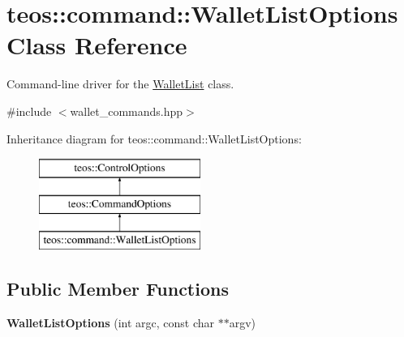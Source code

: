 \hypertarget{classteos_1_1command_1_1_wallet_list_options}{}\section{teos\+:\+:command\+:\+:Wallet\+List\+Options Class Reference}
\label{classteos_1_1command_1_1_wallet_list_options}


Command-\/line driver for the \mbox{\hyperlink{classteos_1_1command_1_1_wallet_list}{Wallet\+List}} class.  




{\ttfamily \#include $<$wallet\+\_\+commands.\+hpp$>$}

Inheritance diagram for teos\+:\+:command\+:\+:Wallet\+List\+Options\+:\begin{figure}[H]
\begin{center}
\leavevmode
\includegraphics[height=3.000000cm]{classteos_1_1command_1_1_wallet_list_options}
\end{center}
\end{figure}
\subsection*{Public Member Functions}
\begin{DoxyCompactItemize}
\item 
\mbox{\label{classteos_1_1command_1_1_wallet_list_options_ad2aa7a86ec76aff6a31278bf8187bfdb}} 
{\bfseries Wallet\+List\+Options} (int argc, const char $\ast$$\ast$argv)
\end{DoxyCompactItemize}
